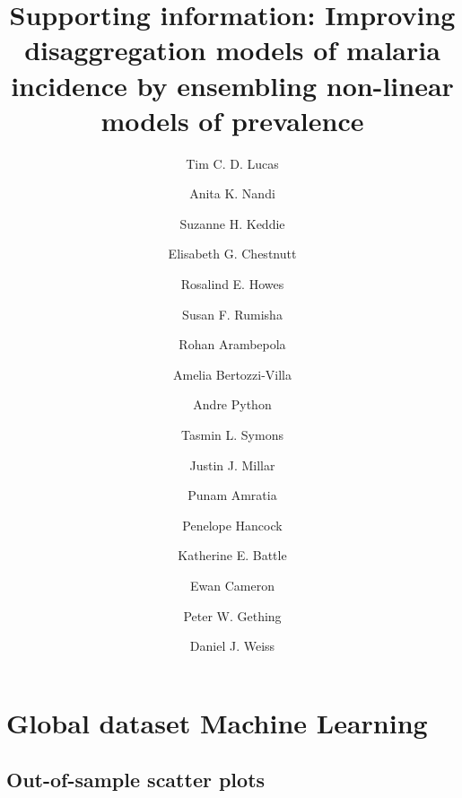 \documentclass[review]{elsarticle}
\begin{document}









\begin{frontmatter}

\title{Supporting information: Improving disaggregation models of malaria incidence by ensembling non-linear models of prevalence}

\author[oxford]{Tim C. D. Lucas}
\author[oxford]{Anita K. Nandi}
\author[oxford]{Suzanne H. Keddie}
\author[oxford]{Elisabeth G. Chestnutt}
\author[oxford]{Rosalind E. Howes}
\author[oxford]{Susan F. Rumisha}
\author[oxford]{Rohan Arambepola}
\author[oxford,idm]{Amelia Bertozzi-Villa}
\author[oxford]{Andre Python}
\author[oxford]{Tasmin L. Symons}
\author[oxford]{Justin J. Millar}
\author[oxford]{Punam Amratia}
\author[oxford]{Penelope Hancock}
\author[oxford]{Katherine E. Battle}
\author[oxford]{Ewan Cameron}
\author[oxford,telethon,curtin]{Peter W. Gething}
\author[oxford]{Daniel J. Weiss}



\address[oxford]{Malaria Atlas Project, Big Data Institute, University of Oxford, Oxford, UK}
\address[idm]{Institute for Disease Modeling, Bellevue, WA, USA}
\address[telethon]{Telethon Kids Institute, Perth Children’s Hospital, Perth, Australia}
\address[curtin]{Curtin University, Perth, Australia}



\end{frontmatter}

\clearpage
\tableofcontents


\clearpage
\section{Global dataset Machine Learning}

\clearpage
\subsection{Out-of-sample scatter plots}
\end{document}
